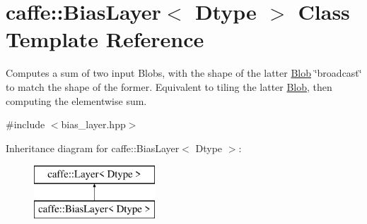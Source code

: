 \hypertarget{classcaffe_1_1BiasLayer}{}\section{caffe\+:\+:Bias\+Layer$<$ Dtype $>$ Class Template Reference}
\label{classcaffe_1_1BiasLayer}


Computes a sum of two input Blobs, with the shape of the latter \hyperlink{classcaffe_1_1Blob}{Blob} \char`\"{}broadcast\char`\"{} to match the shape of the former. Equivalent to tiling the latter \hyperlink{classcaffe_1_1Blob}{Blob}, then computing the elementwise sum.  




{\ttfamily \#include $<$bias\+\_\+layer.\+hpp$>$}

Inheritance diagram for caffe\+:\+:Bias\+Layer$<$ Dtype $>$\+:\begin{figure}[H]
\begin{center}
\leavevmode
\includegraphics[height=2.000000cm]{classcaffe_1_1BiasLayer}
\end{center}
\end{figure}
